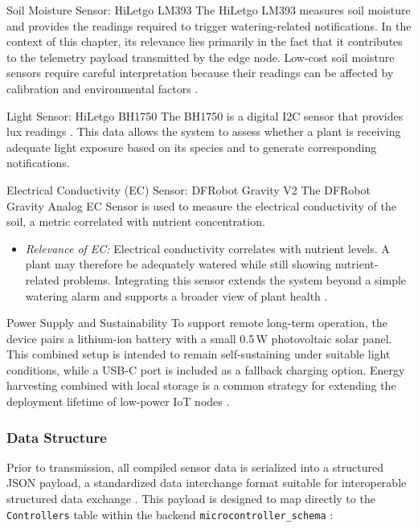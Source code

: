 Soil Moisture Sensor: HiLetgo LM393
The HiLetgo LM393 measures soil moisture and provides the readings required to trigger watering-related notifications. In the context of this chapter, its relevance lies primarily in the fact that it contributes to the telemetry payload transmitted by the edge node. Low-cost soil moisture sensors require careful interpretation because their readings can be affected by calibration and environmental factors \cite{chowdhuryCalibration2022}.

Light Sensor: HiLetgo BH1750
The BH1750 is a digital I2C sensor that provides lux readings \cite{bh1750Datasheet, nxpI2cSpec}. This data allows the system to assess whether a plant is receiving adequate light exposure based on its species and to generate corresponding notifications.

Electrical Conductivity (EC) Sensor: DFRobot Gravity V2
The DFRobot Gravity Analog EC Sensor is used to measure the electrical conductivity of the soil, a metric correlated with nutrient concentration.
\begin{itemize}
    \item \textit{Relevance of EC:} Electrical conductivity correlates with nutrient levels. A plant may therefore be adequately watered while still showing nutrient-related problems. Integrating this sensor extends the system beyond a simple watering alarm and supports a broader view of plant health \cite{boniecki2023smartSensors}.
\end{itemize}

Power Supply and Sustainability
To support remote long-term operation, the device pairs a lithium-ion battery with a small 0.5\,W photovoltaic solar panel. This combined setup is intended to remain self-sustaining under suitable light conditions, while a USB-C port is included as a fallback charging option. Energy harvesting combined with local storage is a common strategy for extending the deployment lifetime of low-power IoT nodes \cite{aliEnergyHarvesting2025}.

\subsubsection{Data Structure}
Prior to transmission, all compiled sensor data is serialized into a structured JSON payload, a standardized data interchange format suitable for interoperable structured data exchange \cite{rfcJSON}. This payload is designed to map directly to the \texttt{Controllers} table within the backend \texttt{microcontroller\_schema} \cite{supabaseCustomSchemas}:


